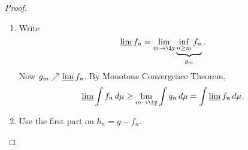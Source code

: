 \begin{proof}
\begin{enumerate}
\item Write
\[
\varliminf f_n=\lim_{m\to \iy} \underbrace{\inf_{n\geq m} f_n}_{g_m}.
\]
Now $g_m\nearrow \varliminf f_n$. 
By Monotone Convergence Theorem,
\[
\varliminf \int f_n \,d\mu \ge \lim_{m\to \iy} \int g_n\,d\mu=\int \varliminf f_n\,d\mu.
\]
\item 
Use the first part on $h_n=g-f_n$.
\end{enumerate} 
\end{proof}